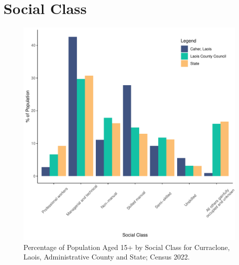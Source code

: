 \documentclass{article}
\begin{document}
\section{Social Class}\label{sect:SC}
\begin{figure}[H]
	\centering
	\includegraphics[width = 140mm]{../figures/SocialClassED.pdf}
	\caption{Percentage of Population Aged 15+ by Social Class for Curraclone, Laois, Administrative County and State; Census 2022.}
	\label{fig:vbnv}
	\end{figure}
\end{document}
